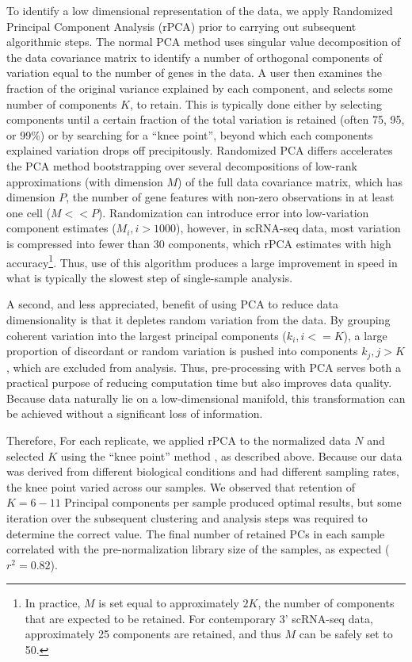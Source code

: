 To identify a low dimensional representation of the data, we apply Randomized Principal Component Analysis (rPCA) \citep{Halko2009,Rokhlin2009} prior to carrying out subsequent algorithmic steps. %
The normal PCA method uses singular value decomposition of the data covariance matrix to identify a number of orthogonal components of variation equal to the number of genes in the data. 
A user then examines the fraction of the original variance explained by each component, and selects some number of components $K$, to retain. This is typically done either by selecting components until a certain fraction of the total variation is retained (often 75, 95, or 99\%) or by searching for a ``knee point'', beyond which each components explained variation drops off precipitously. %
Randomized PCA differs accelerates the PCA method bootstrapping over several decompositions of low-rank approximations (with dimension $M$) of the full data covariance matrix, which has dimension $P$, the number of gene features with non-zero observations in at least one cell ($M << P$). \citep{Halko2009}
Randomization can introduce error into low-variation component estimates ($M_i, i > 1000$), however, in scRNA-seq data, most variation is compressed into fewer than 30 components, which rPCA estimates with high accuracy\footnote{In practice, $M$ is set equal to approximately $2K$, the number of components that are expected to be retained. 
For contemporary 3' scRNA-seq data, approximately 25 components are retained, and thus $M$ can be safely set to 50.}.
Thus, use of this algorithm produces a large improvement in speed in what is typically the slowest step of single-sample analysis.  %

A second, and less appreciated, benefit of using PCA to reduce data dimensionality is that it depletes random variation from the data.
By grouping coherent variation into the largest principal components ($k_i, i <= K$), a large proportion of discordant or random variation is pushed into components $k_j, j > K$, which are excluded from analysis. 
Thus, pre-processing with PCA serves both a practical purpose of reducing computation time but also improves data quality.
Because data naturally lie on a low-dimensional manifold, this transformation can be achieved without a significant loss of information. 

Therefore, For each replicate, we applied rPCA to the normalized data $N$ and selected $K$ using the ``knee point'' method \citep{Valle1999}, as described above. 
Because our data was derived from different biological conditions and had different sampling rates, the knee point varied across our samples.
We observed that retention of  $K=6-11$ Principal components per sample produced optimal results, but some iteration over the subsequent clustering and analysis steps was required to determine the correct value. 
The final number of retained PCs in each sample correlated with the pre-normalization library size of the samples, as expected ($r^2 = 0.82$).

